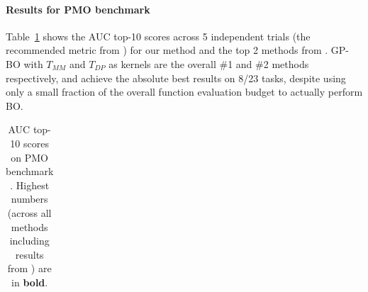 \documentclass{article}
\theoremstyle{plain}
\theoremstyle{definition}
\theoremstyle{remark}
\begin{document}
\paragraph{Results for PMO benchmark}
Table~\ref{tab:pmo-benchmark-results} shows the AUC top-10 scores across 5 independent trials (the recommended metric from \citet{gao2022sample})
for our method and the top 2 methods from \citet{gao2022sample}.
GP-BO with $T_{MM}$ and $T_{DP}$ as kernels are the overall \#1 and \#2 methods respectively,
and achieve the absolute best results on 8/23 tasks,
despite using only a small fraction of the overall function evaluation budget to actually perform BO.

\begin{table}
  \caption{AUC top-10 scores on PMO benchmark \citep{gao2022sample}.
  Highest numbers (across all methods including results from \citet{gao2022sample}) are in \textbf{bold}.}
  \label{tab:pmo-benchmark-results}
  \centering
  \begin{tabular}{c|rrrr}


\end{tabular}
\end{table}
\end{document}

